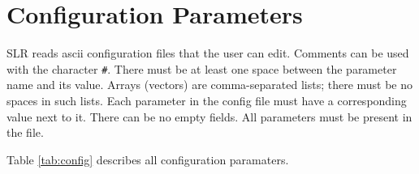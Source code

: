 \documentclass{report}
\begin{document}
\chapter{Configuration Parameters}
\label{sec:config}

SLR reads ascii configuration files that the user can edit.  Comments
can be used with the character \verb|#|.  There must be at least one
space between the parameter name and its value.  Arrays (vectors) are
comma-separated lists; there must be no spaces in such lists.  Each
parameter in the config file must have a corresponding value next to
it.  There can be no empty fields.  All parameters must be present in
the file.

Table \ref{tab:config} describes all configuration paramaters.
\end{document}
